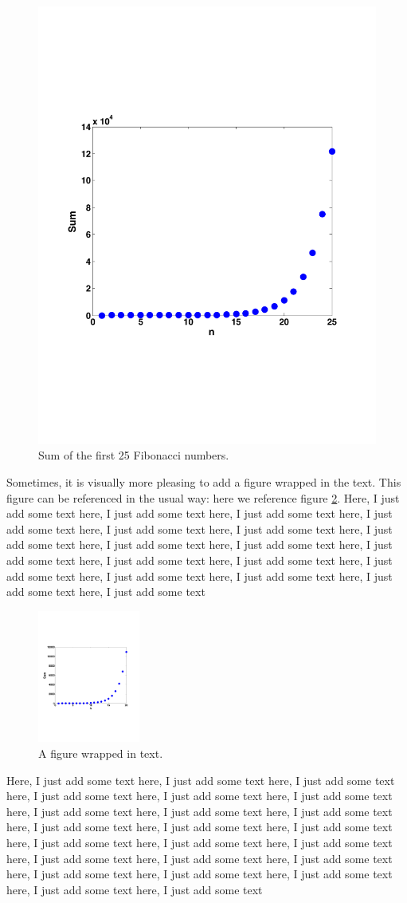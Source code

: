 \documentclass[12pt]{article}
\begin{document}
\begin{figure}[h]
\begin{center}
\includegraphics[width=.5\textwidth]{Sum_Fibonacci_25}
\end{center}
\caption{Sum of the first 25 Fibonacci numbers.} \label{fig::MyFigure}
\end{figure}

Sometimes, it is visually more pleasing to add a figure wrapped in the text. This figure can be referenced in the usual way: here we reference figure \ref{fig::Fibonacci_wrapped}. Here, I just add some text here, I just add some text here, I just add some text here, I just add some text here, I just add some text here, I just add some text here, I just add some text here, I just add some text here, I just add some text here, I just add some text here, I just add some text here, I just add some text here, I just add some text here, I just add some text here, I just add some text here, I just add some text here, I just add some text

\begin{figure}
\centering
    \includegraphics[width=0.3\textwidth]{./Sum_Fibonacci_20}	 
       \caption{A figure wrapped in text.}
    \label{fig::Fibonacci_wrapped}
\end{figure} 
Here, I just add some text here, I just add some text here, I just add some text here, I just add some text here, I just add some text here, I just add some text here, I just add some text here, I just add some text here, I just add some text here, I just add some text here, I just add some text here, I just add some text here, I just add some text here, I just add some text here, I just add some text here, I just add some text here, I just add some text here, I just add some text here, I just add some text here, I just add some text here, I just add some text here, I just add some text here, I just add some text 
\end{document}
